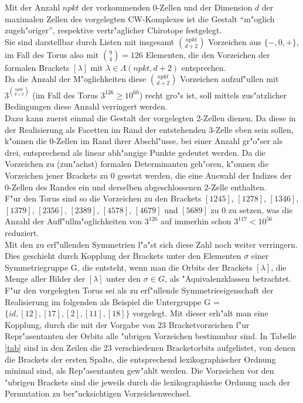 Mit der Anzahl $npkt$ der vorkommenden 0-Zellen und der Dimension $d$ der
maximalen Zellen des vorgelegten CW-Komplexes ist die Gestalt "`m"oglich
zugeh"origer"', respektive vertr"aglicher Chirotope festgelegt.\\
Sie sind darstellbar durch Listen mit insgesamt ${npkt \choose d+2}$
Vorzeichen aus $\{-,0,+\}$, im Fall des Torus also mit ${9 \choose 4}=126$
Elementen, die den Vorzeichen der formalen Brackets $[\lambda]$ mit
$\lambda\in\Lambda(npkt,d+2)$ entsprechen.\\
Da die Anzahl der M"oglichkeiten diese ${npkt \choose d+2}$ Vorzeichen
aufzuf"ullen mit $3^{npkt \choose d+2}$ (im Fall des Torus
$3^{126}\geq 10^{60}$) recht gro"s ist, soll mittels zus"atzlicher Bedingungen
diese Anzahl verringert werden.\\
Dazu kann zuerst einmal die Gestalt der vorgelegten 2-Zellen dienen. Da diese
in der Realisierung als Facetten im Rand der entstehenden 3-Zelle eben sein
sollen, k"onnen die 0-Zellen im Rand ihrer Abschl"usse, bei einer Anzahl
gr"o"ser als drei, entsprechend als linear abh"angige Punkte gedeutet werden.
Da die Vorzeichen zu (zun"achst) formalen Determinanten geh"oren, k"onnen die
Vorzeichen jener Brackets zu 0 gesetzt werden, die eine Auswahl der Indizes der
0-Zellen des Randes ein und derselben abgeschlossenen 2-Zelle enthalten.\\
F"ur den Torus sind so die Vorzeichen zu den Brackets $[1245]$, $[1278]$,
$[1346]$, $[1379]$, $[2356]$, $[2389]$, $[4578]$, $[4679]$ und $[5689]$ zu 0
zu setzen, was die Anzahl der Auf\-f"ull\-m"og\-lich\-kei\-ten von $3^{126}$ auf
immerhin schon $3^{117}< 10^{56}$ reduziert.\\
Mit den zu erf"ullenden Symmetrien l"a"st sich diese Zahl noch weiter
verringern. Dies geschieht durch Kopplung der Brackets unter den Elementen
$\sigma$ einer Symmetriegruppe G, die entsteht, wenn man die Orbits der Brackets
$[\lambda]$, die Menge aller Bilder der $[\lambda]$ unter den $\sigma\in G$, als
"Aquivalenzklassen betrachtet.\\
F"ur den vorgelegten Torus sei als zu erf"ullende Symmetrieeigenschaft der
Realisierung im folgenden als Beispiel die Untergruppe G =
$\{ id, [12], [17], [2], [11], [18] \}$ vorgelegt. Mit dieser erh"alt man eine
Kopplung, durch die mit der Vorgabe von 23 Bracketvorzeichen f"ur
Repr"asentanten der Orbits alle "ubrigen Vorzeichen bestimmbar sind. In Tabelle
\ref{tab} sind in den Zeilen die 23 verschiedenen Bracketorbits aufgelistet,
von denen die Brackets der ersten Spalte, die entsprechend lexikographischer
Ordnung minimal sind, als Rep"asentanten gew"ahlt werden.
Die Vorzeichen vor den "ubrigen Brackets sind die jeweils durch die
lexikographische Ordnung nach der Permutation zu ber"ucksichtigen
Vorzeichenwechsel.

